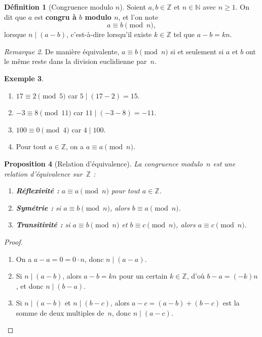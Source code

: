 \documentclass[12pt,a4paper,openany]{book}
\theoremstyle{definition}
\newtheorem{definition}{Définition}[chapter]
\newtheorem{exemple}[definition]{Exemple}
\theoremstyle{plain}
\newtheorem{proposition}[definition]{Proposition}
\theoremstyle{remark}
\newtheorem{remarque}[definition]{Remarque}
\newcommand{\N}{\mathbb{N}}
\newcommand{\Z}{\mathbb{Z}}
\begin{document}
\begin{definition}[Congruence modulo $n$]
\label{def:congruence}
Soient $a, b \in \Z$ et $n \in \N$ avec $n \geqslant 1$.
On dit que $a$ est \textbf{congru à $b$ modulo $n$}, et l'on note
\[
  a \equiv b \pmod{n},
\]
lorsque $n \mid (a - b)$, c'est-à-dire lorsqu'il existe $k \in \Z$ tel que
$a - b = kn$.
\end{definition}

\begin{remarque}
De manière équivalente, $a \equiv b \pmod{n}$ si et seulement si $a$ et $b$
ont le même reste dans la division euclidienne par~$n$.
\end{remarque}

\begin{exemple}
\label{ex:cong-basiques}
\leavevmode
\begin{enumerate}[label=(\roman*)]
  \item $17 \equiv 2 \pmod{5}$ car $5 \mid (17 - 2) = 15$.
  \item $-3 \equiv 8 \pmod{11}$ car $11 \mid (-3 - 8) = -11$.
  \item $100 \equiv 0 \pmod{4}$ car $4 \mid 100$.
  \item Pour tout $a \in \Z$, on a $a \equiv a \pmod{n}$.
\end{enumerate}
\end{exemple}

\begin{proposition}[Relation d'équivalence]
\label{prop:cong-equiv}
La congruence modulo~$n$ est une relation d'équivalence sur~$\Z$ :
\begin{enumerate}[label=(\roman*)]
  \item \textbf{Réflexivité :} $a \equiv a \pmod{n}$ pour tout $a \in \Z$.
  \item \textbf{Symétrie :} si $a \equiv b \pmod{n}$, alors $b \equiv a \pmod{n}$.
  \item \textbf{Transitivité :} si $a \equiv b \pmod{n}$ et $b \equiv c \pmod{n}$,
    alors $a \equiv c \pmod{n}$.
\end{enumerate}
\end{proposition}

\begin{proof}
\leavevmode
\begin{enumerate}[label=(\roman*)]
  \item On a $a - a = 0 = 0 \cdot n$, donc $n \mid (a - a)$.
  \item Si $n \mid (a - b)$, alors $a - b = kn$ pour un certain $k \in \Z$, d'où
    $b - a = (-k)n$, et donc $n \mid (b - a)$.
  \item Si $n \mid (a - b)$ et $n \mid (b - c)$, alors
    $a - c = (a - b) + (b - c)$ est la somme de deux multiples de~$n$,
    donc $n \mid (a - c)$.
    \qedhere
\end{enumerate}
\end{proof}
\end{document}

